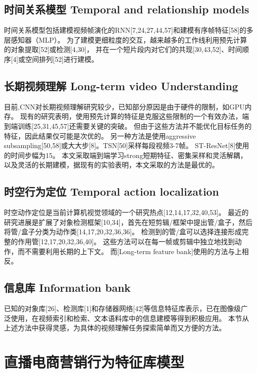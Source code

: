 \subsection{时间关系模型 Temporal and relationship models}

时间关系模型包括建模视频帧演化的RNN[7,24,27,44,57]和建模有序帧特征[58]的多层感知器（MLP）。
为了建模更细粒度的交互，越来越多的工作线利用预先计算的对象提取[52]或检测[4,30]，
并在一个短片段内对它们的共现[30,43,52]、时间顺序[4]或空间排列[52]进行建模。

\subsection{长期视频理解 Long-term video Understanding }

目前,CNN对长期视频理解研究较少，已知部分原因是由于硬件的限制，如GPU内存。
现有的研究表明，使用预先计算的特征是克服这些限制的一个有效办法，端到端训练[25,31,45,57]还需要关键的突破。
但由于这些方法并不能优化目标任务的特征，因此结果仅可能是次优的。
另一种方法是使用aggressive subsampling[50,58]或大大步[8]。TSN[50]采样每段视频3-7帧。
ST-ResNet[8]使用的时间步幅为15。
本文采取端到端学习strong短期特征、密集采样和灵活解耦，以及灵活的长期建模，据现有的实验表明，本文采取的方法是最优的。

\subsection{时空行为定位 Temporal action localization}

时空动作定位是当前计算机视觉领域的一个研究热点[12,14,17,32,40,53]。
最近的研究进展是扩展了对象检测框架[10,34]，首先在短剪辑/框架中提出管/盒子，然后将管/盒子分类为动作类[14,17,20,32,36,36]。
检测到的管/盒可以选择连接形成完整的作用管[12,17,20,32,36,40]。
这些方法可以在每一帧或剪辑中独立地找到动作，而不需要利用长期的上下文。
而[Long-term feature bank]使用的方法与上相反。

\subsection{信息库 Information bank}

已知的对象库[26]、检测库[1]和存储器网络[42]等信息特征库表示，已在图像级广泛使用，在视频索引和检索、文本语料库中的信息建模等得到积极应用。
本节从上述方法中获得灵感，为具体的视频理解任务探索简单而又方便的方法。

\section{直播电商营销行为特征库模型}

